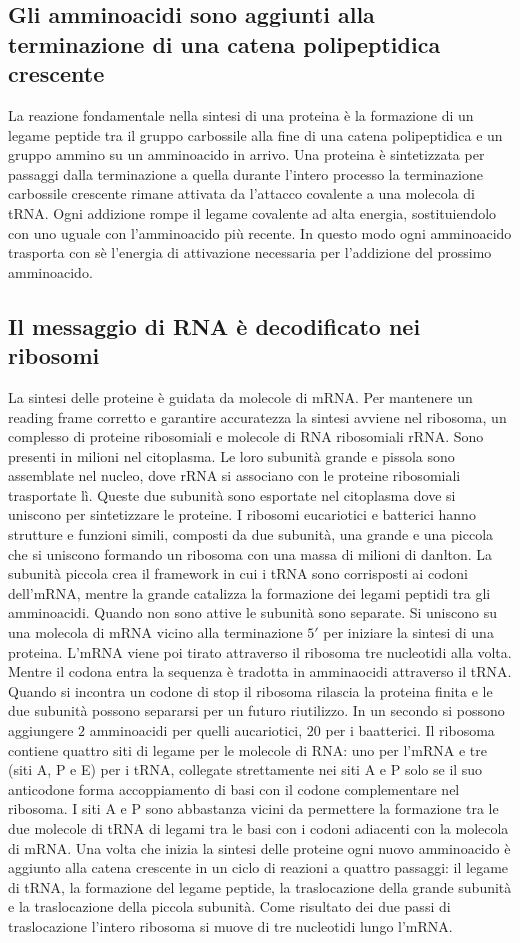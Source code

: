 \subsection{Gli amminoacidi sono aggiunti alla terminazione  di una catena polipeptidica crescente}
La reazione fondamentale nella sintesi di una proteina \`e la formazione di un legame peptide tra il gruppo carbossile alla fine di una catena polipeptidica e un gruppo ammino su un 
amminoacido in arrivo. Una proteina \`e sintetizzata per passaggi dalla terminazione  a quella  durante l'intero processo la terminazione carbossile crescente rimane
attivata da l'attacco covalente a una molecola di tRNA. Ogni addizione rompe il legame covalente ad alta energia, sostituiendolo con uno uguale con l'amminoacido pi\`u recente. In
questo modo ogni amminoacido trasporta con s\`e l'energia di attivazione necessaria per l'addizione del prossimo amminoacido. 
\subsection{Il messaggio di RNA \`e decodificato nei ribosomi}
La sintesi delle proteine \`e guidata da molecole di mRNA. Per mantenere un reading frame corretto e garantire accuratezza la sintesi avviene nel ribosoma, un complesso di proteine
ribosomiali e molecole di RNA ribosomiali rRNA. Sono presenti in milioni nel citoplasma. Le loro subunit\`a grande e pissola sono assemblate nel nucleo, dove rRNA si associano con le 
proteine ribosomiali trasportate l\`i. Queste due subunit\`a sono esportate nel citoplasma dove si uniscono per sintetizzare le proteine. I ribosomi eucariotici e batterici hanno
strutture e funzioni simili, composti da due subunit\`a, una grande e una piccola che si uniscono formando un ribosoma con una massa di milioni di danlton. La subunit\`a piccola 
crea il framework in cui i tRNA sono corrisposti ai codoni dell'mRNA, mentre la grande catalizza la formazione dei legami peptidi tra gli amminoacidi. Quando non sono attive le 
subunit\`a sono separate. Si uniscono su una molecola di mRNA vicino alla terminazione $5'$ per iniziare la sintesi di una proteina. L'mRNA viene poi tirato attraverso il ribosoma tre
nucleotidi alla volta. Mentre il codona entra la sequenza \`e tradotta in amminaocidi attraverso il tRNA. Quando si incontra un codone di stop il ribosoma rilascia la proteina finita e 
le due subunit\`a possono separarsi per un futuro riutilizzo. In un secondo si possono aggiungere $2$ amminoacidi per quelli aucariotici, $20$ per i baatterici. Il ribosoma contiene
quattro siti di legame per le molecole di RNA: uno per l'mRNA e tre (siti A, P e E) per i tRNA, collegate strettamente nei siti A e P solo se il suo anticodone forma accoppiamento di 
basi con il codone complementare nel ribosoma. I siti A e P sono abbastanza vicini da permettere la formazione tra le due molecole di tRNA di legami tra le basi con i codoni adiacenti
con la molecola di mRNA. Una volta che inizia la sintesi delle proteine ogni nuovo amminoacido \`e aggiunto alla catena crescente in un ciclo di reazioni a quattro passaggi: il legame
di tRNA, la formazione del legame peptide, la traslocazione della grande subunit\`a e la traslocazione della piccola subunit\`a. Come risultato dei due passi di traslocazione l'intero
ribosoma si muove di tre nucleotidi lungo l'mRNA.
